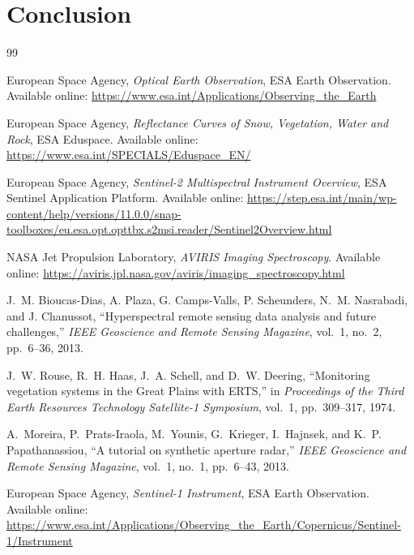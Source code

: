 \documentclass[11pt,a4paper]{article}
\begin{document}
\section{Conclusion}



\begin{thebibliography}{99}

European Space Agency,
\textit{Optical Earth Observation},
ESA Earth Observation.
Available online:
\url{https://www.esa.int/Applications/Observing_the_Earth}

European Space Agency,
\textit{Reflectance Curves of Snow, Vegetation, Water and Rock},
ESA Eduspace.
Available online:
\url{https://www.esa.int/SPECIALS/Eduspace_EN/}

European Space Agency,
\textit{Sentinel-2 Multispectral Instrument Overview},
ESA Sentinel Application Platform.
Available online:
\url{https://step.esa.int/main/wp-content/help/versions/11.0.0/snap-toolboxes/eu.esa.opt.opttbx.s2msi.reader/Sentinel2Overview.html}

NASA Jet Propulsion Laboratory,
\textit{AVIRIS Imaging Spectroscopy}.
Available online:
\url{https://aviris.jpl.nasa.gov/aviris/imaging_spectroscopy.html}

J.~M. Bioucas-Dias, A. Plaza, G. Camps-Valls, P. Scheunders,
N.~M. Nasrabadi, and J. Chanussot,
``Hyperspectral remote sensing data analysis and future challenges,''
\textit{IEEE Geoscience and Remote Sensing Magazine},
vol.~1, no.~2, pp.~6--36, 2013.

J.~W. Rouse, R.~H. Haas, J.~A. Schell, and D.~W. Deering,
``Monitoring vegetation systems in the Great Plains with ERTS,''
in \textit{Proceedings of the Third Earth Resources Technology
Satellite-1 Symposium},
vol.~1, pp.~309--317, 1974.

A.~Moreira, P.~Prats-Iraola, M.~Younis, G.~Krieger, I.~Hajnsek,
and K.~P. Papathanassiou,
``A tutorial on synthetic aperture radar,''
\textit{IEEE Geoscience and Remote Sensing Magazine},
vol.~1, no.~1, pp.~6--43, 2013.

European Space Agency,
\textit{Sentinel-1 Instrument},
ESA Earth Observation.
Available online:
\url{https://www.esa.int/Applications/Observing_the_Earth/Copernicus/Sentinel-1/Instrument}


\end{thebibliography}
\end{document}
